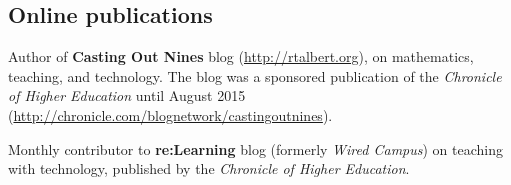\documentclass[letterpaper]{article}
\renewenvironment{itemize}{
  \begin{list}{}{
    \setlength{\leftmargin}{1.5em}
	\setlength{\itemsep}{0in}
  }
}{
  \end{list}
}
\begin{document}
\subsection*{Online publications}

\begin{itemize}
	\item Author of \textbf{Casting Out Nines} blog (\url{http://rtalbert.org}), on mathematics, teaching, and technology. The blog was a sponsored publication of the \emph{Chronicle of Higher Education} until August 2015 (\url{http://chronicle.com/blognetwork/castingoutnines}).
	\item Monthly contributor to \textbf{re:Learning} blog (formerly \emph{Wired Campus}) on teaching with technology, published by the \emph{Chronicle of Higher Education}. 
\end{itemize}
\end{document}
